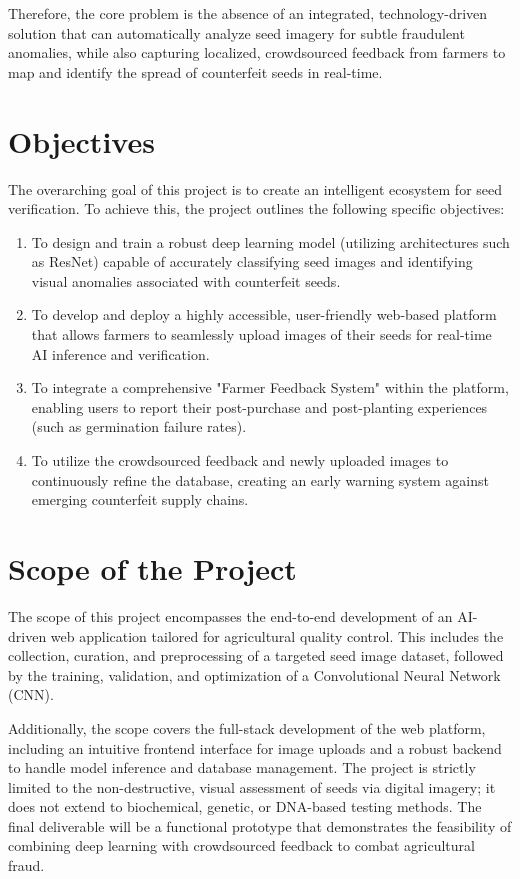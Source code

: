 Therefore, the core problem is the absence of an integrated, technology-driven solution that can automatically analyze seed imagery for subtle fraudulent anomalies, while also capturing localized, crowdsourced feedback from farmers to map and identify the spread of counterfeit seeds in real-time.

\section{Objectives}
The overarching goal of this project is to create an intelligent ecosystem for seed verification. To achieve this, the project outlines the following specific objectives:
\begin{enumerate}
    \item To design and train a robust deep learning model (utilizing architectures such as ResNet) capable of accurately classifying seed images and identifying visual anomalies associated with counterfeit seeds.
    \item To develop and deploy a highly accessible, user-friendly web-based platform that allows farmers to seamlessly upload images of their seeds for real-time AI inference and verification.
    \item To integrate a comprehensive "Farmer Feedback System" within the platform, enabling users to report their post-purchase and post-planting experiences (such as germination failure rates).
    \item To utilize the crowdsourced feedback and newly uploaded images to continuously refine the database, creating an early warning system against emerging counterfeit supply chains.
\end{enumerate}

\section{Scope of the Project}
The scope of this project encompasses the end-to-end development of an AI-driven web application tailored for agricultural quality control. This includes the collection, curation, and preprocessing of a targeted seed image dataset, followed by the training, validation, and optimization of a Convolutional Neural Network (CNN).

Additionally, the scope covers the full-stack development of the web platform, including an intuitive frontend interface for image uploads and a robust backend to handle model inference and database management. The project is strictly limited to the non-destructive, visual assessment of seeds via digital imagery; it does not extend to biochemical, genetic, or DNA-based testing methods. The final deliverable will be a functional prototype that demonstrates the feasibility of combining deep learning with crowdsourced feedback to combat agricultural fraud.
